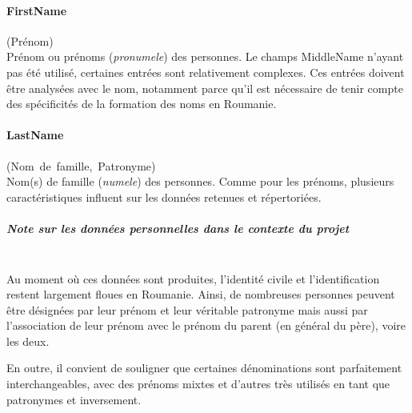\documentclass[a4paper,12pt,twoside]{book}
\begin{document}
                \paragraph{FirstName}\mbox{(Prénom)} \\
                
                Prénom ou prénoms (\textit{pronumele}) des personnes. Le champs \og{}MiddleName\fg{} n'ayant pas été utilisé, certaines entrées sont relativement complexes. Ces entrées doivent être analysées avec le nom, notamment parce qu'il est nécessaire de tenir compte des spécificités de la formation des noms en Roumanie.
                \pagebreak

                \paragraph{LastName}\mbox{(Nom de famille, Patronyme)} \\
                
                Nom(s) de famille (\textit{numele}) des personnes. Comme pour les prénoms, plusieurs caractéristiques influent sur les données retenues et répertoriées.
                
                \subparagraph{Note sur les données personnelles dans le contexte du projet}\mbox{} \\
                \label{spec_noms}
                Au moment où ces données sont produites, l’identité civile et l’identification restent largement floues en Roumanie.
                Ainsi, de nombreuses personnes peuvent être désignées par leur prénom et leur véritable patronyme mais aussi par l'association de leur prénom avec le prénom du parent (en général du père), voire les deux.
                
                En outre, il convient de souligner que certaines dénominations sont parfaitement interchangeables, avec des prénoms mixtes et d'autres très utilisés en tant que patronymes et inversement.
                
\end{document}

